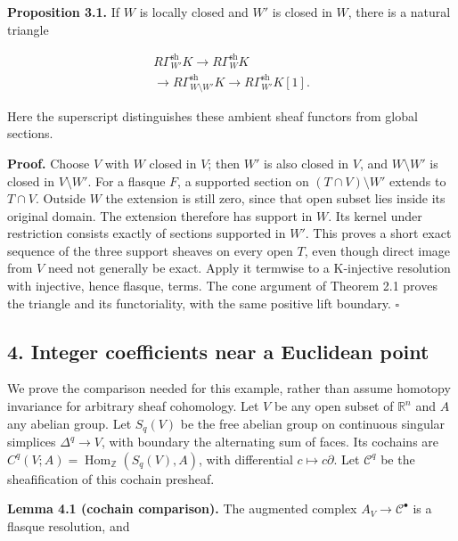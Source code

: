 \documentclass[
  english,
  11pt,
  a4paper,
]{article}
\begin{document}
\textbf{Proposition 3.1.} If \(W\) is locally closed and \(W'\) is
closed in \(W\), there is a natural triangle

\[\begin{gathered}
R\Gamma_{W'}^{\mathrm{sh}}K\longrightarrow R\Gamma_W^{\mathrm{sh}}K\\
\longrightarrow R\Gamma_{W\setminus W'}^{\mathrm{sh}}K
\longrightarrow R\Gamma_{W'}^{\mathrm{sh}}K[1].
\end{gathered}
\tag{3.1}\]

Here the superscript distinguishes these ambient sheaf functors from
global sections.

\textbf{Proof.} Choose \(V\) with \(W\) closed in \(V\); then \(W'\) is
also closed in \(V\), and \(W\setminus W'\) is closed in
\(V\setminus W'\). For a flasque \(F\), a supported section on
\((T\cap V)\setminus W'\) extends to \(T\cap V\). Outside \(W\) the
extension is still zero, since that open subset lies inside its original
domain. The extension therefore has support in \(W\). Its kernel under
restriction consists exactly of sections supported in \(W'\). This
proves a short exact sequence of the three support sheaves on every open
\(T\), even though direct image from \(V\) need not generally be exact.
Apply it termwise to a K-injective resolution with injective, hence
flasque, terms. The cone argument of Theorem 2.1 proves the triangle and
its functoriality, with the same positive lift boundary. \(\square\)

\subsection{4. Integer coefficients near a Euclidean
point}\label{sections-with-support-and-the-localization-triangle--4-integer-coefficients-near-a-euclidean-point}

We prove the comparison needed for this example, rather than assume
homotopy invariance for arbitrary sheaf cohomology. Let \(V\) be any
open subset of \(\mathbb R^n\) and \(A\) any abelian group. Let
\(S_q(V)\) be the free abelian group on continuous singular simplices
\(\Delta^q\to V\), with boundary the alternating sum of faces. Its
cochains are \(C^q(V;A)=\operatorname{Hom}_{\mathbb Z}(S_q(V),A)\), with
differential \(c\mapsto c\partial\). Let \(\mathcal C^q\) be the
sheafification of this cochain presheaf.

\textbf{Lemma 4.1 (cochain comparison).} The augmented complex
\(A_V\to\mathcal C^\bullet\) is a flasque resolution, and
\end{document}
